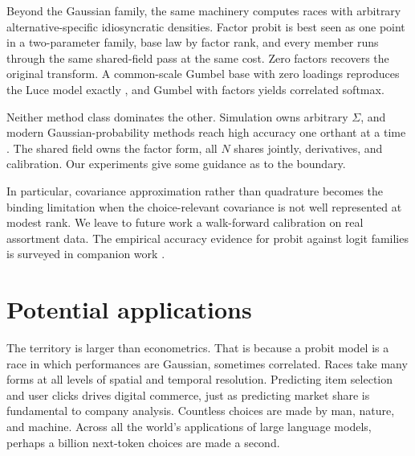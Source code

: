 \documentclass[12pt]{article}
\theoremstyle{remark}
\begin{document}
Beyond the Gaussian family, the same machinery computes races with arbitrary
alternative-specific idiosyncratic densities. Factor probit is best
seen as one point in a two-parameter family, base law by factor rank,
and every member runs through the same shared-field pass at the same
cost. Zero factors recovers the original transform. A common-scale
Gumbel base with zero loadings reproduces the Luce model exactly
\citep{luce1959,yellott1977}, and Gumbel with factors yields
correlated softmax.

Neither method class dominates the other. Simulation owns arbitrary
$\Sigma$, and modern Gaussian-probability methods reach high accuracy
one orthant at a time \citep{botev2017,fasano2025,cao2025}. The shared
field owns the factor form, all $N$ shares jointly, derivatives, and
calibration. Our experiments give some guidance as to the boundary. 

In particular, covariance approximation rather than quadrature
becomes the binding limitation when the choice-relevant covariance is
not well represented at modest rank. We leave to future work a
walk-forward calibration on real assortment data. The empirical
accuracy evidence for probit against logit families is surveyed in
companion work \citep{cottonsurvey}.

\section{Potential applications}\label{sec:applications}

The territory is larger than econometrics. That is because a probit model is a race in which performances
are Gaussian, sometimes correlated. Races take many forms at all levels of spatial and temporal resolution. Predicting item selection and user clicks drives digital commerce, just as 
predicting market share is fundamental to company analysis. Countless choices are made by man, nature, and machine. Across all the world's applications
of large language models, perhaps a billion next-token choices are made a second.
\end{document}
